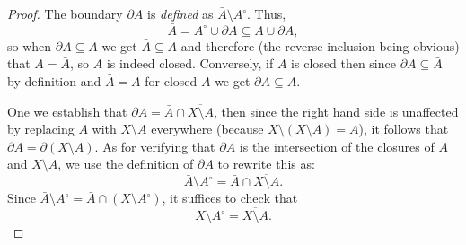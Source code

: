 \begin{proof}
  The boundary \(\partial A\) is \emph{defined} as \(\bar A\setminus
  A^\circ\). Thus,
  \[
    \bar A=A^\circ\cup\partial A\subseteq A\cup\partial A,
  \]
  so when \(\partial A\subseteq A\) we get \(\bar A\subseteq A\) and
  therefore (the reverse inclusion being obvious) that \(A=\bar A\), so
  \(A\) is indeed closed. Conversely, if \(A\) is closed then since
  \(\partial A\subseteq\bar A\) by definition and \(\bar A=A\) for closed
  \(A\) we get \(\partial A\subseteq A\).

  One we establish that \(\partial A=\bar A \cap\overline{X\setminus A}\),
  then since the right hand side is unaffected by replacing \(A\) with
  \(X\setminus A\) everywhere (because \(X\setminus (X\setminus A)=A\)), it
  follows that \(\partial A=\partial(X\setminus A)\). As for verifying that
  \(\partial A\) is the intersection of the closures of \(A\) and
  \(X\setminus A\), we use the definition of \(\partial A\) to rewrite this
  as:
  \[
    \bar A\setminus A^\circ=\bar A\cap\overline{X\setminus A}.
  \]
  Since \(\bar A\setminus A^\circ=\bar A\cap(X\setminus A^\circ)\), it
  suffices to check that
  \[
    X\setminus A^\circ=\overline{X\setminus A}.
  \]
\end{proof}

